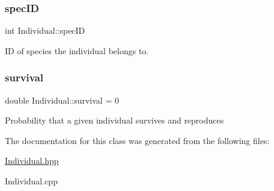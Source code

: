 \subsubsection{\texorpdfstring{spec\+ID}{specID}}
{\footnotesize\ttfamily int Individual\+::spec\+ID}

ID of species the individual belongs to. \mbox{\label{classIndividual_adbd7cefa7cf5847a6a20e14c04ab20dd}} 
\subsubsection{\texorpdfstring{survival}{survival}}
{\footnotesize\ttfamily double Individual\+::survival = 0}

Probability that a given individual survives and reproduces 

The documentation for this class was generated from the following files\+:\begin{DoxyCompactItemize}
\item 
\hyperlink{Individual_8hpp}{Individual.\+hpp}\item 
Individual.\+cpp\end{DoxyCompactItemize}
